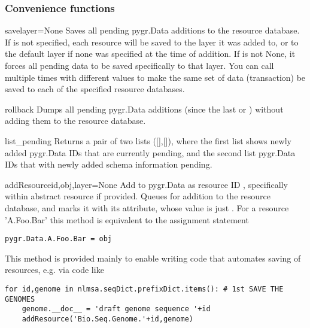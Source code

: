 \documentclass{howto}
\begin{document}
\subsubsection{Convenience functions}
\begin{funcdesc}{save}{layer=None}
  Saves all pending pygr.Data additions to the resource database.
  If  is not specified, each resource will be saved to the
  layer it was added to, or to the default layer if none was specified
  at the time of addition.  If  is not None, it forces all
  pending data to be saved specifically to that layer.  You can call
   multiple times with different 
  values to make the same set of data (transaction) be saved to each
  of the specified resource databases.
\end{funcdesc}

\begin{funcdesc}{rollback}{}
  Dumps all pending pygr.Data additions (since the last 
  or ) without adding them to the resource database.
\end{funcdesc}

\begin{funcdesc}{list_pending}{}
  Returns a pair of two lists ([],[]), where
  the first list shows newly added pygr.Data IDs that are currently pending,
  and the second list pygr.Data IDs that with newly added schema information
  pending.
\end{funcdesc}

\begin{funcdesc}{addResource}{id,obj,layer=None}
  Add  to pygr.Data as resource ID , specifically within
  abstract resource  if provided.  Queues  for addition to 
  the resource database, and marks it with its 
  attribute, whose value is just .  For a resource  'A.Foo.Bar'
  this method is equivalent to the assignment statement
\begin{verbatim}
pygr.Data.A.Foo.Bar = obj
\end{verbatim}
  This method is provided mainly to enable writing code that automates
  saving of resources, e.g. via code like
\begin{verbatim}
for id,genome in nlmsa.seqDict.prefixDict.items(): # 1st SAVE THE GENOMES
    genome.__doc__ = 'draft genome sequence '+id
    addResource('Bio.Seq.Genome.'+id,genome)
\end{verbatim}
\end{funcdesc}
\end{document}

